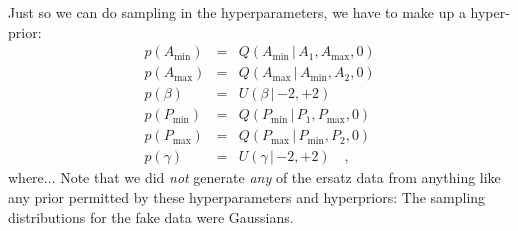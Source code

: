 \documentclass[12pt]{article}
\newcommand{\given}{\,|\,}
\newcommand{\pdf}{p}
\newcommand{\amp}{A}
\newcommand{\period}{P}
\newcommand{\ampmin}{\amp_{\min}}
\newcommand{\ampmax}{\amp_{\max}}
\newcommand{\amppower}{\beta}
\newcommand{\periodmin}{\period_{\min}}
\newcommand{\periodmax}{\period_{\max}}
\newcommand{\periodpower}{\gamma}
\newcommand{\pareto}{Q}
\newcommand{\uniform}{U}
\begin{document}
Just so we can do sampling in the hyperparameters, we have to make up
a hyper-prior:
\begin{eqnarray}
\pdf(\ampmin)
  &=&
\pareto(\ampmin\given\amp_1,\ampmax,0)
\\
\pdf(\ampmax)
  &=&
\pareto(\ampmax\given\ampmin,\amp_2,0)
\\
\pdf(\amppower)
  &=&
\uniform(\amppower\given {-2},{+2})
\\
\pdf(\periodmin)
  &=&
\pareto(\periodmin\given\period_1,\periodmax,0)
\\
\pdf(\periodmax)
  &=&
\pareto(\periodmax\given\periodmin,\period_2,0)
\\
\pdf(\periodpower)
  &=&
\uniform(\periodpower\given {-2},{+2})
\quad,
\end{eqnarray}
where...  Note that we did \emph{not} generate \emph{any} of the
ersatz data from anything like any prior permitted by these
hyperparameters and hyperpriors: The sampling distributions for the
fake data were Gaussians.
\end{document}
